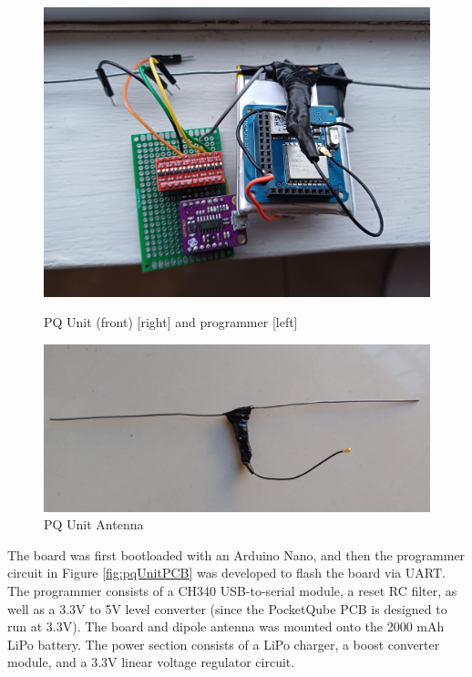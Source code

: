 \begin{figure}[!htb]
  \begin{minipage}{.49\textwidth}
    \centering
    \includegraphics[width=0.85\linewidth]{pqUnitPCB}
    \caption{PQ Unit (front) [right] and programmer [left]}
    \label{fig:pqUnitPCB}
  \end{minipage}
  \begin{minipage}{.49\textwidth}
    \centering
    \includegraphics[width=0.95\linewidth]{pqAntenna}
    \caption{PQ Unit Antenna}
    \label{fig:pqAntenna}
  \end{minipage}
\end{figure}

The board was first bootloaded with an Arduino Nano, and then the programmer circuit in Figure \ref{fig:pqUnitPCB} was developed to flash the board via UART. The programmer consists of a CH340 USB-to-serial module, a reset RC filter, as well as a 3.3V to 5V level converter (since the PocketQube PCB is designed to run at 3.3V). The board and dipole antenna was mounted onto the 2000 mAh LiPo battery. The power section consists of a LiPo charger, a boost converter module, and a 3.3V linear voltage regulator circuit.